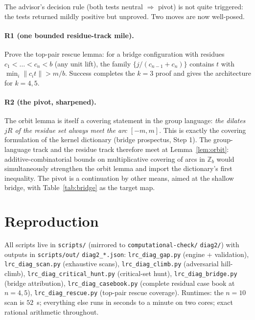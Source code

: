 \documentclass[11pt,a4paper]{article}
\theoremstyle{plain}
\theoremstyle{definition}
\theoremstyle{remark}
\newcommand{\norm}[1]{\lVert #1 \rVert}
\newcommand{\Z}{\mathbb{Z}}
\begin{document}
The advisor's decision rule (both tests neutral $\Rightarrow$ pivot) is not quite
triggered: the tests returned mildly positive but unproved. Two moves are now
well-posed.

\paragraph{R1 (one bounded residue-track mile).} Prove the top-pair rescue lemma: for a
bridge configuration with residues $c_1 < \dots < c_n < b$ (any unit lift), the family
$\{j/(c_{n-1} + c_n)\}$ contains $t$ with $\min_i \norm{c_i t} > m/b$. Success completes
the $k = 3$ proof and gives the architecture for $k = 4, 5$.

\paragraph{R2 (the pivot, sharpened).} The orbit lemma is itself a covering statement in
the group language: \emph{the dilates $jR$ of the residue set always meet the arc
$[-m, m]$}. This is exactly the covering formulation of the kernel dictionary (bridge
prospectus, Step 1). The group-language track and the residue track therefore meet at
Lemma~\ref{lem:orbit}: additive-combinatorial bounds on multiplicative covering of arcs
in $\Z_b$ would simultaneously strengthen the orbit lemma and import the dictionary's
first inequality. The pivot is a continuation by other means, aimed at the shallow
bridge, with Table~\ref{tab:bridge} as the target map.

\section{Reproduction}\label{sec:repro}

All scripts live in \texttt{scripts/} (mirrored to \texttt{computational-check/} \allowbreak
\texttt{diag2/}) with outputs in \texttt{scripts/out/} \allowbreak
\texttt{diag2\_*.json}: \texttt{lrc\_diag\_gap.py} (engine + validation),
\texttt{lrc\_diag\_scan.py} (exhaustive scans), \texttt{lrc\_diag\_climb.py}
(adversarial hill-climb), \texttt{lrc\_diag\_critical\_hunt.py} (critical-set hunt),
\texttt{lrc\_diag\_bridge.py} (bridge attribution), \texttt{lrc\_diag\_casebook.py}
(complete residual case book at $n = 4, 5$), \texttt{lrc\_diag\_rescue.py} (top-pair
rescue coverage). Runtimes: the $n = 10$ scan is $52$~s; everything else runs in
seconds to a minute on two cores; exact rational arithmetic throughout.
\end{document}
